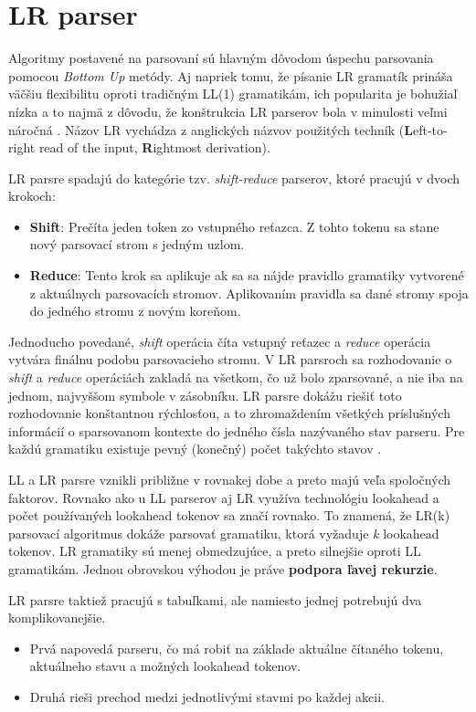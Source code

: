 \section{LR parser}\label{LR}
Algoritmy postavené na  parsovaní sú hlavným dôvodom úspechu parsovania pomocou \textit{Bottom Up} metódy. Aj napriek tomu, že písanie LR gramatík prináša väčšiu flexibilitu oproti tradičným LL(1) gramatikám, ich popularita je bohužiaľ nízka a to najmä z dôvodu, že konštrukcia LR parserov bola v minulosti veľmi náročná \cite{tomassetti:parsing}. Názov LR vychádza z anglických názvov použitých techník (\textbf{L}eft-to-right read of the input, \textbf{R}ightmost derivation).

LR parsre spadajú do kategórie tzv. \textit{shift-reduce} parserov, ktoré pracujú v dvoch krokoch:
\begin{itemize}
\item \textbf{Shift}: Prečíta jeden token zo vstupného reťazca. Z tohto tokenu sa stane nový parsovací strom s jedným uzlom.
\item \textbf{Reduce}: Tento krok sa aplikuje ak sa sa nájde pravidlo gramatiky vytvorené z aktuálnych parsovacích stromov. Aplikovaním pravidla sa dané stromy spoja do jedného stromu z novým koreňom.
\end{itemize}

Jednoducho povedané, \textit{shift} operácia číta vstupný reťazec a \textit{reduce} operácia vytvára finálnu podobu parsovacieho stromu. V LR parsroch sa rozhodovanie o \textit{shift} a \textit{reduce} operáciách zakladá na všetkom, čo už bolo zparsované, a nie iba na jednom, najvyššom symbole v zásobníku. LR parsre dokážu riešiť toto rozhodovanie konštantnou rýchlosťou, a to zhromaždením všetkých príslušných informácií o sparsovanom kontexte do jedného čísla nazývaného stav parseru. Pre každú gramatiku existuje pevný (konečný) počet takýchto stavov \cite{LR}.

LL a LR parsre vznikli približne v rovnakej dobe a preto majú veľa spoločných faktorov. Rovnako ako u LL parserov aj LR využíva technológiu lookahead a počet používaných lookahead tokenov sa značí rovnako. To znamená, že LR(k) parsovací algoritmus dokáže parsovať gramatiku, ktorá vyžaduje \textit{k} lookahead tokenov. LR gramatiky sú menej obmedzujúce, a preto silnejšie oproti LL gramatikám. Jednou obrovskou výhodou je práve \textbf{podpora ľavej rekurzie}.

LR parsre taktiež pracujú s tabuľkami, ale namiesto jednej potrebujú dva komplikovanejšie. 
\begin{itemize}
\item Prvá napovedá parseru, čo má robiť na základe aktuálne čítaného tokenu, aktuálneho stavu a možných lookahead tokenov.
\item Druhá rieši prechod medzi jednotlivými stavmi po každej akcii.
\end{itemize}

